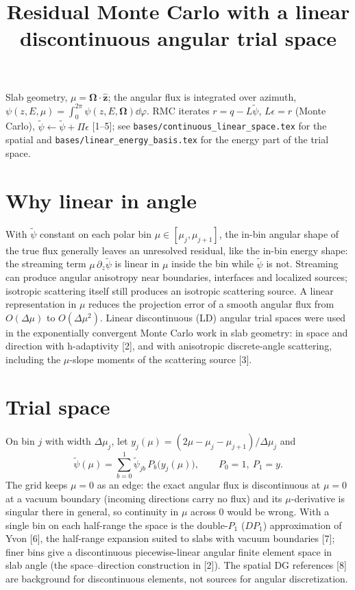 \documentclass[11pt]{article}
\title{Residual Monte Carlo with a linear discontinuous angular trial space}
\date{}
\newcommand{\tpsi}{\tilde\psi}
\begin{document}
\maketitle

\noindent Slab geometry, $\mu=\boldsymbol\Omega\cdot\hat{\mathbf z}$; the angular flux is
integrated over azimuth, $\psi(z,E,\mu)=\int_0^{2\pi}\psi(z,E,\boldsymbol\Omega)\dd\varphi$.
RMC iterates $r=q-L\tpsi$, $L\epsilon=r$ (Monte Carlo), $\tpsi\leftarrow\tpsi+\Pi\epsilon$
[1--5]; see \texttt{bases/continuous\_linear\_space.tex} for the spatial and
\texttt{bases/linear\_energy\_basis.tex} for the energy part of the trial space.

\section{Why linear in angle}

With $\tpsi$ constant on each polar bin $\mu\in[\mu_j,\mu_{j+1}]$, the in-bin angular
shape of the true flux generally leaves an unresolved residual, like the in-bin
energy shape: the streaming term $\mu\,\partial_z\tpsi$ is linear in $\mu$ inside the
bin while $\tpsi$ is not. Streaming can produce angular anisotropy near boundaries,
interfaces and localized sources; isotropic scattering itself still produces an
isotropic scattering source. A linear representation
in $\mu$ reduces the projection error of a smooth angular flux from $O(\Delta\mu)$ to
$O(\Delta\mu^2)$. Linear discontinuous (LD) angular trial spaces were used in the
exponentially convergent Monte Carlo work in slab geometry: in space and direction with
h-adaptivity [2], and with anisotropic discrete-angle scattering, including the
$\mu$-slope moments of the scattering source [3].

\section{Trial space}

On bin $j$ with width $\Delta\mu_j$, let $y_j(\mu)=(2\mu-\mu_j-\mu_{j+1})/\Delta\mu_j$
and
\begin{equation}
  \tpsi(\mu) = \sum_{b=0}^{1}\tpsi_{jb}\,P_b\big(y_j(\mu)\big),\qquad P_0=1,\ P_1=y .
\end{equation}
The grid keeps $\mu=0$ as an edge: the exact angular flux is discontinuous at $\mu=0$ at
a vacuum boundary (incoming directions carry no flux) and its $\mu$-derivative is
singular there in general, so continuity in $\mu$ across $0$ would be wrong. With a
single bin on each half-range the space is the double-$P_1$ ($DP_1$) approximation of
Yvon [6], the half-range expansion suited to slabs with vacuum boundaries [7]; finer
bins give a discontinuous piecewise-linear angular finite element space in slab
angle (the space--direction construction in [2]). The spatial DG references [8]
are background for discontinuous elements, not sources for angular discretization.
\end{document}
